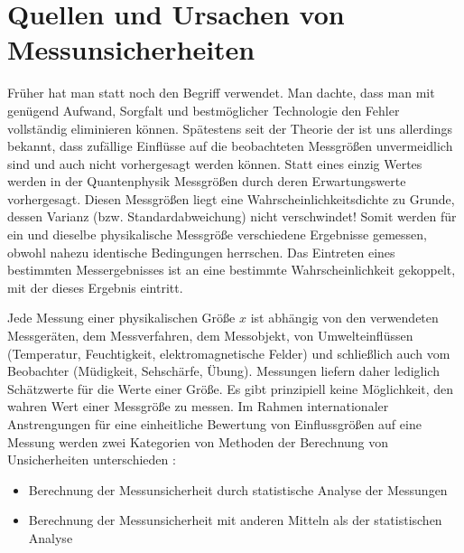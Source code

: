 \documentclass[letterpaper,10pt,english]{jupyterBook}
\begin{document}
\sphinxstepscope


\section{Quellen und Ursachen von Messunsicherheiten}
\label{\detokenize{content/1_Messunsicherheiten:quellen-und-ursachen-von-messunsicherheiten}}\label{\detokenize{content/1_Messunsicherheiten::doc}}
\sphinxAtStartPar
Früher hat man statt  noch den Begriff  verwendet. Man dachte, dass man mit genügend Aufwand, Sorgfalt und bestmöglicher Technologie den Fehler vollständig eliminieren können. Spätestens seit der Theorie der  ist uns allerdings bekannt, dass zufällige Einflüsse auf die beobachteten Messgrößen  unvermeidlich sind und auch nicht vorhergesagt werden können. Statt eines einzig  Wertes werden in der Quantenphysik Messgrößen durch deren Erwartungswerte vorhergesagt. Diesen Messgrößen liegt eine Wahrscheinlichkeitsdichte zu Grunde, dessen Varianz (bzw. Standardabweichung) nicht verschwindet! Somit werden für ein und dieselbe physikalische Messgröße verschiedene Ergebnisse gemessen, obwohl nahezu identische Bedingungen herrschen. Das Eintreten eines bestimmten Messergebnisses ist an eine bestimmte Wahrscheinlichkeit gekoppelt, mit der dieses Ergebnis eintritt.

\sphinxAtStartPar
Jede Messung einer physikalischen Größe \(x\) ist abhängig von den verwendeten Messgeräten, dem Messverfahren, dem Messobjekt, von Umwelteinflüssen (Temperatur, Feuchtigkeit, elektromagnetische Felder) und schließlich auch vom Beobachter (Müdigkeit, Sehschärfe, Übung). Messungen liefern daher lediglich Schätzwerte für die  Werte einer Größe. Es gibt prinzipiell keine Möglichkeit, den wahren Wert einer Messgröße zu messen. Im Rahmen internationaler Anstrengungen für eine einheitliche Bewertung von Einflussgrößen auf eine Messung werden zwei Kategorien von Methoden der Berechnung von Unsicherheiten unterschieden :
\begin{itemize}
\item {} 
\sphinxAtStartPar
{} Berechnung der Messunsicherheit durch statistische Analyse der Messungen

\item {} 
\sphinxAtStartPar
{} Berechnung der Messunsicherheit mit anderen Mitteln als der statistischen Analyse

\end{itemize}
\end{document}
